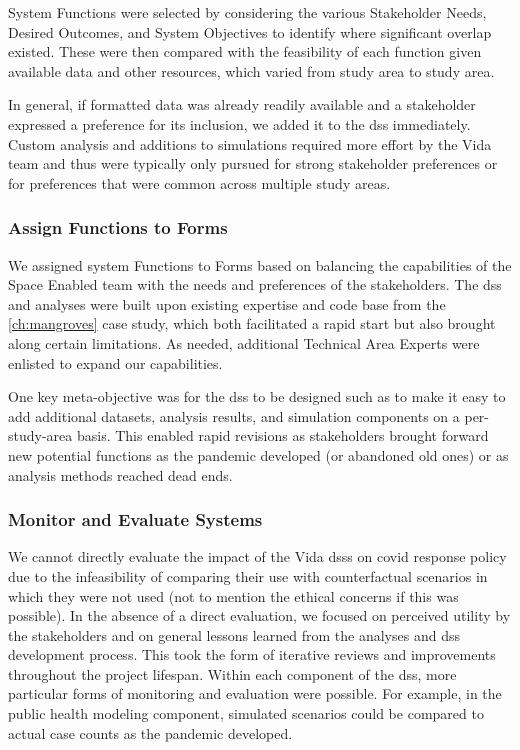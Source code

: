 System Functions were selected by considering the various Stakeholder Needs, Desired Outcomes, and System Objectives to identify where significant overlap existed. These were then compared with the feasibility of each function given available data and other resources, which varied from study area to study area.

In general, if formatted data was already readily available and a stakeholder expressed a preference for its inclusion, we added it to the \ac{dss} immediately. Custom analysis and additions to simulations required more effort by the Vida team and thus were typically only pursued for strong stakeholder preferences or for preferences that were common across multiple study areas.

\subsubsection{Assign Functions to Forms}

We assigned system Functions to Forms based on balancing the capabilities of the Space Enabled team with the needs and preferences of the stakeholders. The \ac{dss} and analyses were built upon existing expertise and code base from the \ref{ch:mangroves} case study, which both facilitated a rapid start but also brought along certain limitations. As needed, additional Technical Area Experts were enlisted to expand our capabilities. 

One key meta-objective was for the \ac{dss} to be designed such as to make it easy to add additional datasets, analysis results, and simulation components on a per-study-area basis. This enabled rapid revisions as stakeholders brought forward new potential functions as the pandemic developed (or abandoned old ones) or as analysis methods reached dead ends.

\subsubsection{Monitor and Evaluate Systems}

We cannot directly evaluate the impact of the Vida \acp{dss} on \ac{covid} response policy due to the infeasibility of comparing their use with counterfactual scenarios in which they were not used (not to mention the ethical concerns if this was possible). In the absence of a direct evaluation, we focused on perceived utility by the stakeholders and on general lessons learned from the analyses and \ac{dss} development process. This took the form of iterative reviews and improvements throughout the project lifespan. Within each component of the \ac{dss}, more particular forms of monitoring and evaluation were possible. For example, in the public health modeling component, simulated scenarios could be compared to actual case counts as the pandemic developed.

